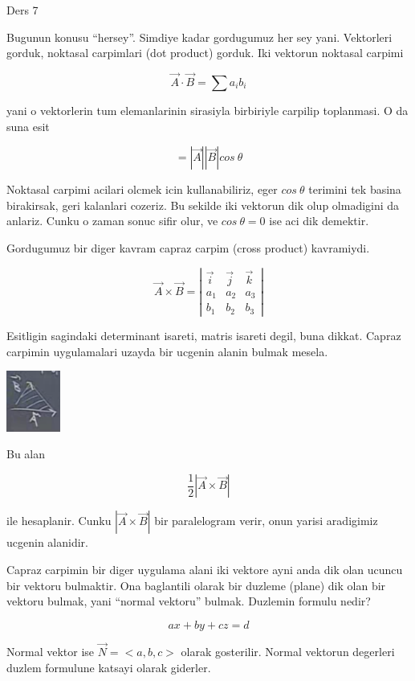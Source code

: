 \documentclass[12pt,fleqn]{article}
\begin{document}
Ders 7

Bugunun konusu ``hersey''. Simdiye kadar gordugumuz her sey
yani. Vektorleri gorduk, noktasal carpimlari (dot product) gorduk. Iki
vektorun noktasal carpimi

\[ \vec{A} \cdot \vec{B} = \sum a_ib_i\]

yani o vektorlerin tum elemanlarinin sirasiyla birbiriyle carpilip
toplanmasi. O da suna esit

\[ = |\vec{A}||\vec{B}|cos \ \theta \]

Noktasal carpimi acilari olcmek icin kullanabiliriz, eger $cos \ \theta$
terimini tek basina birakirsak, geri kalanlari cozeriz. Bu sekilde iki
vektorun dik olup olmadigini da anlariz. Cunku o zaman sonuc sifir olur, ve
$cos \ \theta = 0$ ise aci dik demektir. 

Gordugumuz bir diger kavram capraz carpim (cross product) kavramiydi. 

\[ \vec{A} \times \vec{B} = 
\left|\begin{array}{rrr}
\vec{i} & \vec{j} & \vec{k}  \\
a_1 & a_2 & a_3 \\
b_1 & b_2 & b_3 
\end{array}\right|
\]

Esitligin sagindaki determinant isareti, matris isareti degil, buna
dikkat. Capraz carpimin uygulamalari uzayda bir ucgenin alanin bulmak
mesela. 

\includegraphics[height=2cm]{7_1.png}

Bu alan

\[ \frac{1}{2}|\vec{A} \times \vec{B}| \]

ile hesaplanir. Cunku $|\vec{A} \times \vec{B}|$ bir paralelogram verir, onun yarisi 
aradigimiz ucgenin alanidir.

Capraz carpimin bir diger uygulama alani iki vektore ayni anda dik olan
ucuncu bir vektoru bulmaktir. Ona baglantili olarak bir duzleme (plane) dik
olan bir vektoru bulmak, yani ``normal vektoru'' bulmak. Duzlemin formulu
nedir? 

\[ ax + by + cz  = d \]

Normal vektor ise $\vec{N} = <a,b,c>$ olarak gosterilir. Normal vektorun
degerleri duzlem formulune katsayi olarak giderler. 
\end{document}
